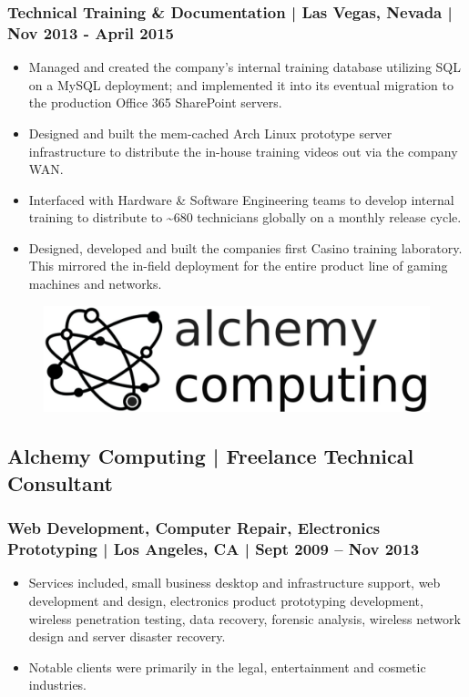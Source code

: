 \documentclass[letter,10pt]{article}
\begin{document}
\subsubsection*{Technical Training \& Documentation | Las Vegas, Nevada | Nov 2013 - April 2015}
\label{sec:org1d617e7}
\begin{itemize}
\item Managed and created the company’s internal training database utilizing SQL on a MySQL deployment; and implemented it into its eventual migration to the production Office 365 SharePoint servers.
\item Designed and built the mem-cached Arch Linux prototype server infrastructure to distribute the in-house training videos out via the company WAN.
\item Interfaced with Hardware \& Software Engineering teams to develop internal training to distribute to \textasciitilde{}680 technicians globally on a monthly release cycle.
\item Designed, developed and built the companies first Casino training laboratory. This mirrored the in-field deployment for the entire product line of gaming machines and networks.
\end{itemize}



\begin{figure}
\includegraphics[width=0.8\linewidth]{./img/50p_alchemy_computing.jpg}
\end{figure}

\subsection*{Alchemy Computing | Freelance Technical Consultant}
\label{sec:org2f7e795}
\subsubsection*{Web Development, Computer Repair, Electronics Prototyping | Los Angeles, CA | Sept 2009 – Nov 2013}
\label{sec:org2ba2ae6}
\begin{itemize}
\item Services included, small business desktop and infrastructure support, web development and design, electronics product prototyping development, wireless penetration testing, data recovery, forensic analysis, wireless network design and server disaster recovery.
\item Notable clients were primarily in the legal, entertainment and cosmetic industries.
\end{itemize}
\end{document}
